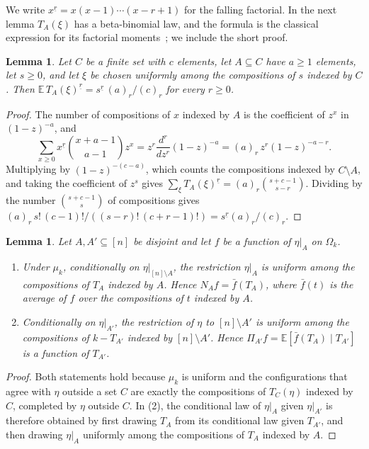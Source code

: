 \documentclass[11pt]{amsart}
\newtheorem{lem}[thm]{Lemma}
\theoremstyle{remark}
\numberwithin{equation}{section}
\newcommand{\ff}[2]{#1^{\underline{#2}}}
\begin{document}
We write $\ff xr=x(x-1)\cdots(x-r+1)$ for the falling factorial. In the next lemma $T_A(\xi)$ has a beta-binomial law, and the formula is the classical expression for its factorial moments~\cite[Chapter~6]{JKK05}; we include the short proof.

\begin{lem}\label{lem:moment}
Let $C$ be a finite set with $c$ elements, let $A\subseteq C$ have $a\ge1$ elements, let $s\ge0$, and let $\xi$ be chosen uniformly among the compositions of $s$ indexed by $C$. Then $\mathbb E\,\ff{T_A(\xi)}{r}=\ff sr\,(a)_r/(c)_r$ for every $r\ge0$.
\end{lem}

\begin{proof}
The number of compositions of $x$ indexed by $A$ is the coefficient of $z^x$ in $(1-z)^{-a}$, and
\[
\sum_{x\ge0}\ff xr\binom{x+a-1}{a-1}z^x=z^r\frac{d^r}{dz^r}(1-z)^{-a}=(a)_r\,z^r(1-z)^{-a-r}.
\]
Multiplying by $(1-z)^{-(c-a)}$, which counts the compositions indexed by $C\setminus A$, and taking the coefficient of $z^s$ gives $\sum_\xi\ff{T_A(\xi)}r=(a)_r\binom{s+c-1}{s-r}$. Dividing by the number $\binom{s+c-1}{s}$ of compositions gives $(a)_r\,s!\,(c-1)!/((s-r)!\,(c+r-1)!)=\ff sr(a)_r/(c)_r$.
\end{proof}

\begin{lem}\label{lem:cond}
Let $A,A'\subseteq[n]$ be disjoint and let $f$ be a function of $\eta|_A$ on $\Omega_k$.
\begin{enumerate}
\item Under $\mu_k$, conditionally on $\eta|_{[n]\setminus A}$, the restriction $\eta|_A$ is uniform among the compositions of $T_A$ indexed by $A$. Hence $N_Af=\bar f(T_A)$, where $\bar f(t)$ is the average of $f$ over the compositions of $t$ indexed by $A$.
\item Conditionally on $\eta|_{A'}$, the restriction of $\eta$ to $[n]\setminus A'$ is uniform among the compositions of $k-T_{A'}$ indexed by $[n]\setminus A'$. Hence $\Pi_{A'}f=\mathbb E[\bar f(T_A)\mid T_{A'}]$ is a function of $T_{A'}$.
\end{enumerate}
\end{lem}

\begin{proof}
Both statements hold because $\mu_k$ is uniform and the configurations that agree with $\eta$ outside a set $C$ are exactly the compositions of $T_C(\eta)$ indexed by $C$, completed by $\eta$ outside $C$. In (2), the conditional law of $\eta|_A$ given $\eta|_{A'}$ is therefore obtained by first drawing $T_A$ from its conditional law given $T_{A'}$, and then drawing $\eta|_A$ uniformly among the compositions of $T_A$ indexed by $A$.
\end{proof}
\end{document}
